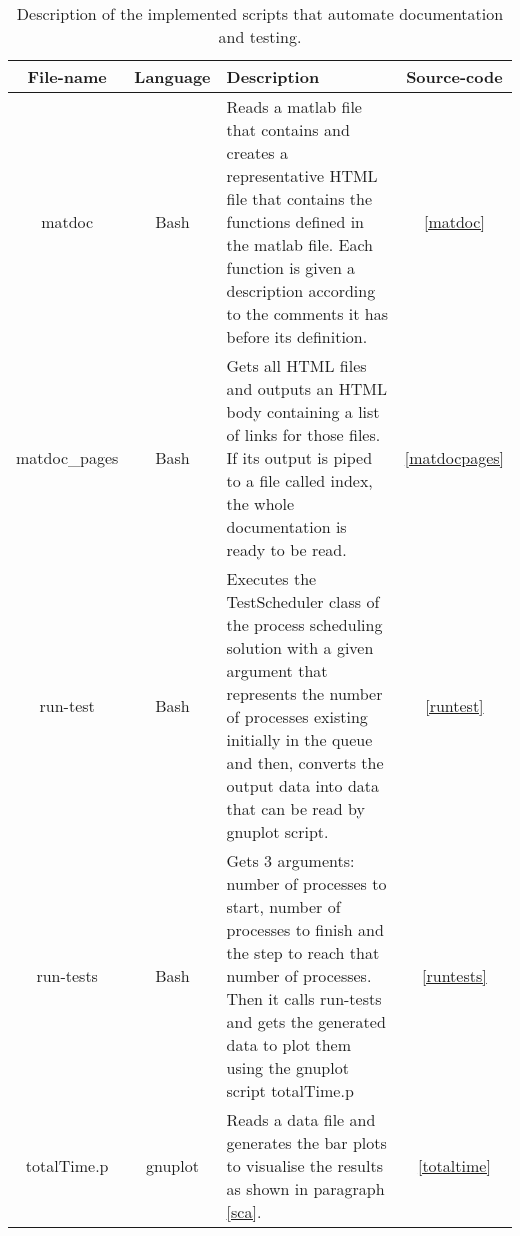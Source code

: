 \begin{table}
\begin{center}
\begin{tabular}{| c | c | p{10cm} | c |}
\hline
File-name & Language & Description & Source-code \\ \hline
matdoc & Bash & Reads a matlab file that contains and creates a representative HTML file that contains the functions defined in the matlab file. Each function is given a description according to the comments it has before its definition. & \ref{matdoc} \\ \hline

matdoc\_pages & Bash & Gets all HTML files and outputs an HTML body containing a list of links for those files. If its output is piped to a file called index, the whole documentation is ready to be read. & \ref{matdocpages} \\ \hline
run-test & Bash & Executes the TestScheduler class of the process scheduling solution with a given argument that represents the number of processes existing initially in the queue and then, converts the output data into data that can be read by gnuplot script. & \ref{runtest} \\ \hline

run-tests & Bash & Gets 3 arguments: number of processes to start, number of processes to finish and the step to reach that number of processes. Then it calls run-tests and gets the generated data to plot them using the gnuplot script totalTime.p & \ref{runtests} \\ \hline

totalTime.p & gnuplot & Reads a data file and generates the bar plots to visualise the results as shown in paragraph \ref{sca}. & \ref{totaltime} \\ \hline
\end{tabular}
\end{center}
\caption{Description of the implemented scripts that automate documentation and testing.}
\label{scripttable}
\end{table}
